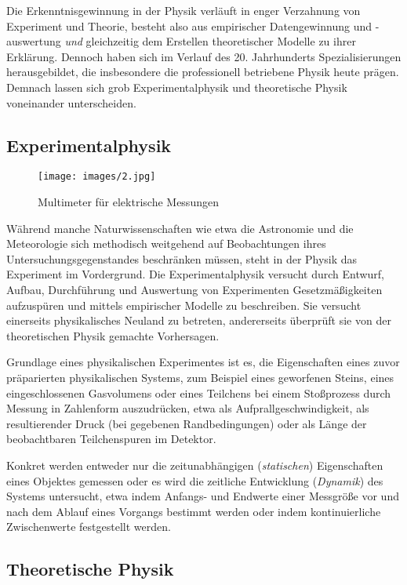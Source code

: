 \documentclass[titlepage, parkskip=full, twocolumn, landscape]{scrartcl}
\begin{document}
Die Erkenntnisgewinnung in der Physik verläuft in enger Verzahnung von Experiment und Theorie, besteht also aus empirischer Datengewinnung und -auswertung \emph{und} gleichzeitig dem Erstellen theoretischer Modelle zu ihrer Erklärung. Dennoch haben sich im Verlauf des 20. Jahrhunderts Spezialisierungen herausgebildet, die insbesondere die professionell betriebene Physik heute prägen. Demnach lassen sich grob Experimentalphysik und theoretische Physik voneinander unterscheiden.

\subsection{Experimentalphysik}

\begin{figure}
	\centering
	\texttt{[image: images/2.jpg]}
	\caption{Multimeter für elektrische Messungen}
\end{figure}

Während manche Naturwissenschaften wie etwa die Astronomie und die Meteorologie sich methodisch weitgehend auf Beobachtungen ihres Untersuchungsgegenstandes beschränken müssen, steht in der Physik das Experiment im Vordergrund. Die Experimentalphysik versucht durch Entwurf, Aufbau, Durchführung und Auswertung von Experimenten Gesetzmäßigkeiten aufzuspüren und mittels empirischer Modelle zu beschreiben. Sie versucht einerseits physikalisches Neuland zu betreten, andererseits überprüft sie von der theoretischen Physik gemachte Vorhersagen.

Grundlage eines physikalischen Experimentes ist es, die Eigenschaften eines zuvor präparierten physikalischen Systems, zum Beispiel eines geworfenen Steins, eines eingeschlossenen Gasvolumens oder eines Teilchens bei einem Stoßprozess durch Messung in Zahlenform auszudrücken, etwa als Aufprallgeschwindigkeit, als resultierender Druck (bei gegebenen Randbedingungen) oder als Länge der beobachtbaren Teilchenspuren im Detektor.

Konkret werden entweder nur die zeitunabhängigen (\emph{statischen}) Eigenschaften eines Objektes gemessen oder es wird die zeitliche Entwicklung (\emph{Dynamik}) des Systems untersucht, etwa indem Anfangs- und Endwerte einer Messgröße vor und nach dem Ablauf eines Vorgangs bestimmt werden oder indem kontinuierliche Zwischenwerte festgestellt werden.

\subsection{Theoretische Physik}
\end{document}
